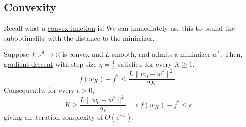 \subsection{Convexity} 

	Recall what a \hyperref[real-def:convex_functions]{convex function} is. We can immediately use this to bound the suboptimality with the distance to the minimizer. 

	\begin{theorem}
	  \label{thm:convergence-of-gradient-descent-for-smooth}
		Suppose $f: \mathbb{R}^d \to \mathbb{R}$ is convex and $L$-smooth, and admits a minimizer $w^\ast$. Then, \hyperref[def:gradient_descent]{gradient descent} with step size $\eta = \frac{1}{L}$ satisfies, for every $K \geq 1$,
		\begin{equation}
			f(w_K) - f^\ast \leq \frac{L \|w_0 - w^\ast\|^2}{2K}.
		\end{equation}
		Consequently, for every $\epsilon > 0$, 
		\begin{equation}
			K \geq \frac{L \|w_0 - w^\ast\|^2}{2\epsilon} \implies f(w_K) - f^\ast \leq \epsilon
		\end{equation}
		giving an iteration complexity of $O(\epsilon^{-1})$.
	\end{theorem}
